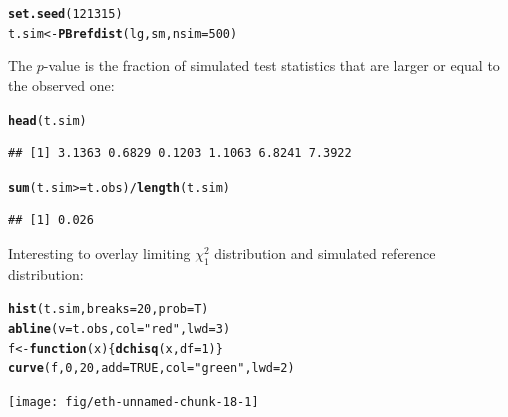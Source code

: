 \documentclass[compress]{beamer}\usepackage[]{graphicx}\usepackage[]{color}
\makeatletter
\newcommand{\hlnum}[1]{\textcolor[rgb]{0.686,0.059,0.569}{#1}}%
\newcommand{\hlstr}[1]{\textcolor[rgb]{0.192,0.494,0.8}{#1}}%
\newcommand{\hlopt}[1]{\textcolor[rgb]{0,0,0}{#1}}%
\newcommand{\hlstd}[1]{\textcolor[rgb]{0.345,0.345,0.345}{#1}}%
\newcommand{\hlkwa}[1]{\textcolor[rgb]{0.161,0.373,0.58}{\textbf{#1}}}%
\newcommand{\hlkwb}[1]{\textcolor[rgb]{0.69,0.353,0.396}{#1}}%
\newcommand{\hlkwc}[1]{\textcolor[rgb]{0.333,0.667,0.333}{#1}}%
\newcommand{\hlkwd}[1]{\textcolor[rgb]{0.737,0.353,0.396}{\textbf{#1}}}%
\newenvironment{kframe}{%
 \def\at@end@of@kframe{}%
 \ifinner\ifhmode%
  \def\at@end@of@kframe{\end{minipage}}%
  \begin{minipage}{\columnwidth}%
 \fi\fi%
 \def\FrameCommand##1{\hskip\@totalleftmargin \hskip-\fboxsep
 \colorbox{shadecolor}{##1}\hskip-\fboxsep
     \hskip-\linewidth \hskip-\@totalleftmargin \hskip\columnwidth}%
 \MakeFramed {\advance\hsize-\width
   \@totalleftmargin\z@ \linewidth\hsize
   \@setminipage}}%
 {\par\unskip\endMakeFramed%
 \at@end@of@kframe}
\newenvironment{knitrout}{}{} %
\newenvironment{sframe}
{\begin{frame} [containsverbatim] }
  {\end{frame}}
\makeatother
\begin{document}
\begin{sframe}

\begin{knitrout}\tiny
{}\color{fgcolor}\begin{kframe}
\begin{alltt}
\hlkwd{set.seed}\hlstd{(}\hlnum{121315}\hlstd{)}
\hlstd{t.sim} \hlkwb{<-} \hlkwd{PBrefdist}\hlstd{(lg, sm,} \hlkwc{nsim}\hlstd{=}\hlnum{500}\hlstd{)}
\end{alltt}
\end{kframe}
\end{knitrout}
  
The $p$-value
is the fraction of simulated test statistics that are larger or equal to the
observed one:

\begin{knitrout}\tiny
{}\color{fgcolor}\begin{kframe}
\begin{alltt}
\hlkwd{head}\hlstd{(t.sim)}
\end{alltt}
\begin{verbatim}
## [1] 3.1363 0.6829 0.1203 1.1063 6.8241 7.3922
\end{verbatim}
\begin{alltt}
\hlkwd{sum}\hlstd{( t.sim} \hlopt{>=} \hlstd{t.obs )} \hlopt{/} \hlkwd{length}\hlstd{( t.sim )}
\end{alltt}
\begin{verbatim}
## [1] 0.026
\end{verbatim}
\end{kframe}
\end{knitrout}
\end{sframe}

\begin{sframe}

  Interesting to overlay limiting $\chi^2_1$
  distribution and simulated reference distribution:
  
\begin{knitrout}\tiny
{}\color{fgcolor}\begin{kframe}
\begin{alltt}
\hlkwd{hist}\hlstd{(t.sim,} \hlkwc{breaks}\hlstd{=}\hlnum{20}\hlstd{,} \hlkwc{prob}\hlstd{=T)}
\hlkwd{abline}\hlstd{(}\hlkwc{v}\hlstd{=t.obs,} \hlkwc{col}\hlstd{=}\hlstr{"red"}\hlstd{,} \hlkwc{lwd}\hlstd{=}\hlnum{3}\hlstd{)}
\hlstd{f} \hlkwb{<-} \hlkwa{function}\hlstd{(}\hlkwc{x}\hlstd{)\{}\hlkwd{dchisq}\hlstd{(x,} \hlkwc{df}\hlstd{=}\hlnum{1}\hlstd{)\}}
\hlkwd{curve}\hlstd{(f,} \hlnum{0}\hlstd{,} \hlnum{20}\hlstd{,} \hlkwc{add}\hlstd{=}\hlnum{TRUE}\hlstd{,} \hlkwc{col}\hlstd{=}\hlstr{"green"}\hlstd{,} \hlkwc{lwd}\hlstd{=}\hlnum{2}\hlstd{)}
\end{alltt}
\end{kframe}
\texttt{[image: fig/eth-unnamed-chunk-18-1]} 

\end{knitrout}
  
\end{sframe}
\end{document}
